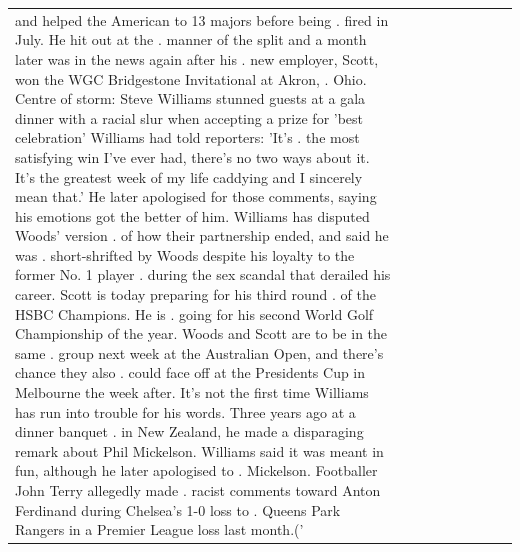 \begin{table}[H]
\begin{tabular}{lllrlllll}
and helped the American to 13 majors before being . fired in July. He hit out at the . manner of the split and a month later was in the news again after his . new employer, Scott, won the WGC Bridgestone Invitational at Akron, . Ohio. Centre of storm: Steve Williams stunned guests at a gala dinner with a racial slur when accepting a prize for 'best celebration' Williams had told reporters: 'It's . the most satisfying win I've ever had, there's no two ways about it. It's the greatest week of my life caddying and I sincerely mean that.' He later apologised for those comments, saying his emotions got the better of him. Williams has disputed Woods' version . of how their partnership ended, and said he was . short-shrifted by Woods despite his loyalty to the former No. 1 player . during the sex scandal that derailed his career. Scott is today preparing for his third round . of the HSBC Champions. He is . going for his second World Golf Championship of the year. Woods and Scott are to be in the same . group next week at the Australian Open, and there's chance they also . could face off at the Presidents Cup in Melbourne the week after. It's not the first time Williams has run into trouble for his words. Three years ago at a dinner banquet . in New Zealand, he made a disparaging remark about Phil Mickelson. Williams said it was meant in fun, although he later apologised to . Mickelson. Footballer John Terry allegedly made . racist comments toward Anton Ferdinand during Chelsea's 1-0 loss to . Queens Park Rangers in a Premier League loss last month.('%
\cline{1-9}

\end{tabular}
\end{table}
